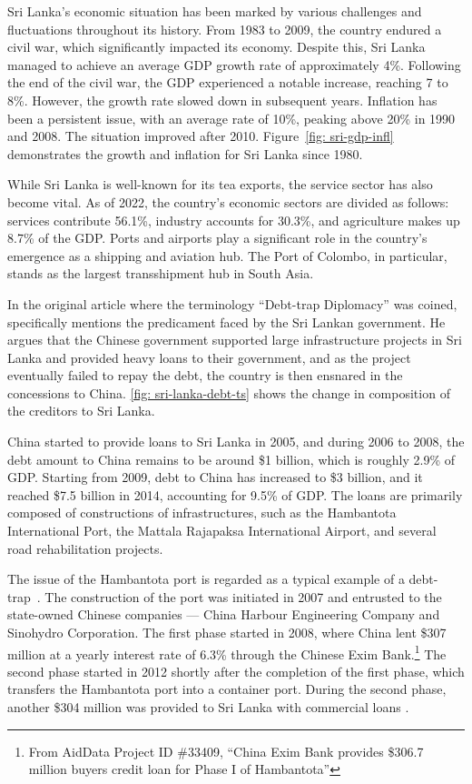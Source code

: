 Sri Lanka's economic situation has been marked by various challenges and fluctuations throughout its history. From 1983 to 2009, the country endured a civil war, which significantly impacted its economy. Despite this, Sri Lanka managed to achieve an average GDP growth rate of approximately 4\%. Following the end of the civil war, the GDP experienced a notable increase, reaching 7 to 8\%. However, the growth rate slowed down in subsequent years. Inflation has been a persistent issue, with an average rate of 10\%, peaking above 20\% in 1990 and 2008. The situation improved after 2010. Figure~\ref{fig: sri-gdp-infl} demonstrates the growth and inflation for Sri Lanka since 1980.

While Sri Lanka is well-known for its tea exports, the service sector has also become vital. As of 2022, the country's economic sectors are divided as follows: services contribute 56.1\%, industry accounts for 30.3\%, and agriculture makes up 8.7\% of the GDP. Ports and airports play a significant role in the country's emergence as a shipping and aviation hub. The Port of Colombo, in particular, stands as the largest transshipment hub in South Asia.

In the original article where the terminology ``Debt-trap Diplomacy'' was coined, \citet{Chellaney_2017} specifically mentions the predicament faced by the Sri Lankan government. He argues that the Chinese government supported large infrastructure projects in Sri Lanka and provided heavy loans to their government, and as the project eventually failed to repay the debt, the country is then ensnared in the concessions to China. \autoref{fig: sri-lanka-debt-ts} shows the change in composition of the creditors to Sri Lanka.

China started to provide loans to Sri Lanka in 2005, and during 2006 to 2008, the debt amount to China remains to be around \$1 billion, which is roughly 2.9\% of GDP. Starting from 2009, debt to China has increased to \$3 billion, and it reached \$7.5 billion in 2014, accounting for 9.5\% of GDP. The loans are primarily composed of constructions of infrastructures, such as the Hambantota International Port, the Mattala Rajapaksa International Airport, and several road rehabilitation projects.

The issue of the Hambantota port is regarded as a typical example of a debt-trap~\citep*{Moramudali_2020}.
The construction of the port was initiated in 2007 and entrusted to the state-owned Chinese companies --- China Harbour Engineering Company and Sinohydro Corporation.
The first phase started in 2008, where China lent \$307 million at a yearly interest rate of 6.3\% through the Chinese Exim Bank.\footnote{
    From AidData Project ID \#33409, ``China Exim Bank provides \$306.7 million buyers credit loan for Phase I of Hambantota''}
The second phase started in 2012 shortly after the completion of the first phase, which transfers the Hambantota port into a container port\cite{}. During the second phase, another \$304 million was provided to Sri Lanka with commercial loans \citep{Horn-Reinhart-Trebesch-21}.


